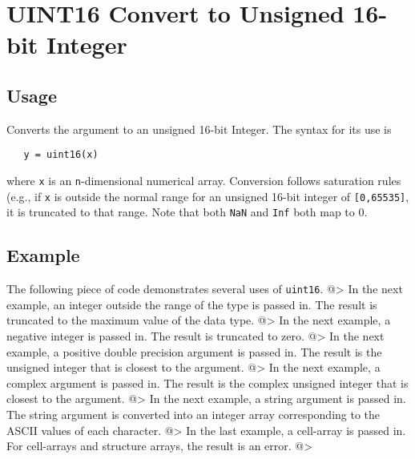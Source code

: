 \section{UINT16 Convert to Unsigned 16-bit Integer}

\subsection{Usage}

Converts the argument to an unsigned 16-bit Integer.  The syntax
for its use is
\begin{verbatim}
   y = uint16(x)
\end{verbatim}
where \verb|x| is an \verb|n|-dimensional numerical array.  Conversion
follows saturation rules (e.g., if \verb|x| is outside the normal
range for an unsigned 16-bit integer of \verb|[0,65535]|, it is truncated
to that range.  Note that
both \verb|NaN| and \verb|Inf| both map to 0.
\subsection{Example}

The following piece of code demonstrates several uses of \verb|uint16|.
@>
In the next example, an integer outside the range  of the type is passed in.  
The result is truncated to the maximum value of the data type.
@>
In the next example, a negative integer is passed in.  The result is 
truncated to zero.
@>
In the next example, a positive double precision argument is passed in.  
The result is the unsigned integer that is closest to the argument.
@>
In the next example, a complex argument is passed in.  The result is the 
complex unsigned integer that is closest to the argument.
@>
In the next example, a string argument is passed in.  The string argument is converted into an integer array corresponding to the ASCII values of each character.
@>
In the last example, a cell-array is passed in.  For cell-arrays and structure arrays, the result is an error.
@>
